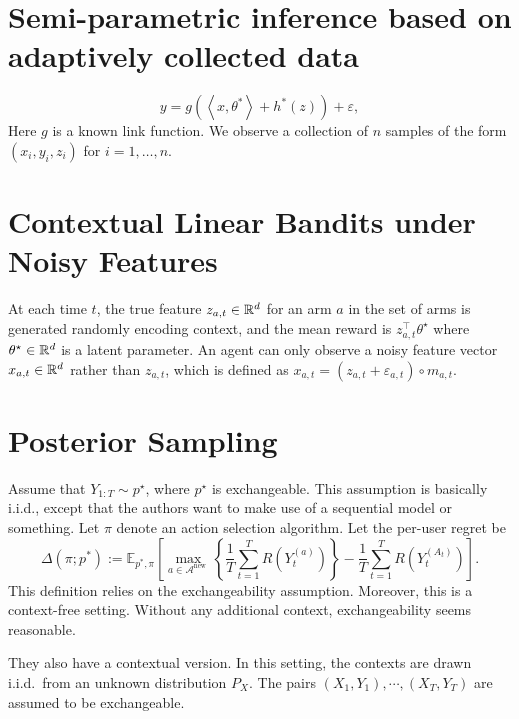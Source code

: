 \documentclass[letterpaper,11pt]{article}
\begin{document}
\section{Semi-parametric inference based on
adaptively collected data}

$$
y=g\left(\left\langle x, \theta^*\right\rangle+h^*(z)\right)+\varepsilon,
$$
Here $g$ is a known link function. 
We observe a collection of $n$ samples of the form $\left(x_i, y_i, z_i\right)$ for $i=1, \ldots, n$.





\section{Contextual Linear Bandits under Noisy Features}

At each time $t$, the true feature $z_{a,t} \in \mathbb{R}^d$ for an arm $a$ in the set of arms is generated randomly encoding context, and the mean reward is $z_{a,t}^\top \theta^\star$ where $\theta^\star \in \mathbb{R}^d$ is a latent parameter. An agent can only observe a noisy feature vector $x_{a,t} \in \mathbb{R}^d$ rather than $z_{a,t}$, which is defined as $x_{a,t} = (z_{a,t} + \varepsilon_{a,t}) \circ m_{a,t}$. 



\section{Posterior Sampling}

Assume that $Y_{1:T} \sim p^\star$, where $p^\star$ is exchangeable. 
This assumption is basically i.i.d., except that the authors want to make use of a sequential model or something. 
Let $\pi$ denote an action selection algorithm. 
Let the per-user regret be 
$$
    \Delta\left(\pi ; p^*\right):=\mathbb{E}_{p^*, \pi}\left[\max _{a \in \mathcal{A}^{\text {new }}}\left\{\frac{1}{T} \sum_{t=1}^T R\left(Y_t^{(a)}\right)\right\}-\frac{1}{T} \sum_{t=1}^T R\left(Y_t^{\left(A_t\right)}\right)\right] .
$$
This definition relies on the exchangeability assumption. 
Moreover, this is a context-free setting. 
Without any additional context, exchangeability seems reasonable. 

They also have a contextual version. 
In this setting, the contexts are drawn i.i.d.~from an unknown distribution $P_X$. 
The pairs $(X_1, Y_1), \cdots, (X_T, Y_T)$ are assumed to be exchangeable. 
\end{document}
